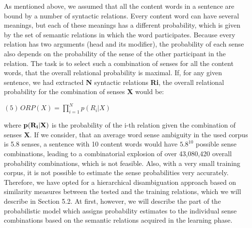 As mentioned above, we assumed that all the content words in a sentence are bound by a number of syntactic relations. Every content word can have several meanings, but each of these meanings has a different probability, which is given by the set of semantic relations in which the word participates. Because every relation has two arguments (head and its modifier), the probability of each sense also depends on the probability of the sense of the other participant in the relation. The task is to select such a combination of senses for all the content words, that the overall relational probability is maximal. If, for any given sentence, we had extracted {\bf N} syntactic relations {\bf Ri}, the overall relational probability for the combination of senses {\bf X} would be:
\begin{center}
$(5) \, \displaystyle ORP(X)=\prod_{i=1}^{N}p(R_{i}|X)$
\end{center}
where ${\bf p(R_{i}|X)}$ is the probability of the i-th relation given the combination of senses {\bf X}. If we consider, that an average word sense ambiguity in the used corpus is 5.8 senses, a sentence with 10 content words would have $5.8^{10}$ possible sense combinations, leading to a combinatorial explosion of over 43,080,420 overall probability combinations, which is not feasible. Also, with a very small training corpus, it is not possible to estimate the sense probabilities very accurately. Therefore, we have opted for a hierarchical disambiguation approach based on similarity measures between the tested and the training relations, which we will describe in Section 5.2. At first, however, we will describe the part of the probabilistic model which assigns probability estimates to the individual sense combinations based on the semantic relations acquired in the learning phase.

